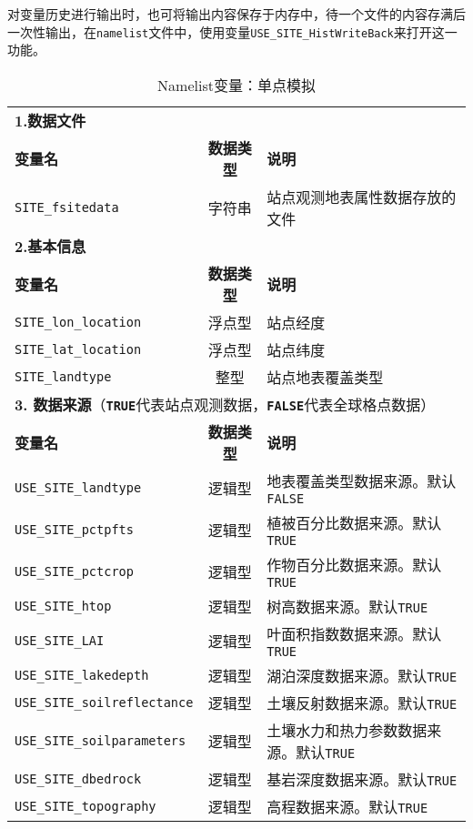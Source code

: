 对变量历史进行输出时，也可将输出内容保存于内存中，待一个文件的内容存满后一次性输出，在\texttt{namelist}文件中，使用变量\texttt{USE\_SITE\_HistWriteBack}来打开这一功能。

\begin{table}[!htbp] \small
\caption{Namelist变量：单点模拟}
\label{table_nl_singlepoint}
\centering \renewcommand{\arraystretch}{1.5}
\begin{tabular}{lcp{}}
\toprule
\textbf{1.数据文件} & & \\
\textbf{变量名} & \textbf{数据类型} & \textbf{说明} \\
\texttt{SITE\_fsitedata} & 字符串 & 站点观测地表属性数据存放的文件 \\\midrule
\textbf{2.基本信息} & & \\
\textbf{变量名} & \textbf{数据类型} & \textbf{说明} \\
\texttt{SITE\_lon\_location} & 浮点型 & 站点经度 \\
\texttt{SITE\_lat\_location} & 浮点型 & 站点纬度 \\
\texttt{SITE\_landtype} & 整型 & 站点地表覆盖类型 \\
\midrule
\multicolumn{3}{l}{\textbf{3. 数据来源}（\textbf{\texttt{TRUE}}代表站点观测数据，\textbf{\texttt{FALSE}}代表全球格点数据）} \\
\textbf{变量名} & \textbf{数据类型} & \textbf{说明} \\
\texttt{USE\_SITE\_landtype} & 逻辑型 & 地表覆盖类型数据来源。默认\texttt{FALSE} \\
\texttt{USE\_SITE\_pctpfts} & 逻辑型 & 植被百分比数据来源。默认\texttt{TRUE} \\
\texttt{USE\_SITE\_pctcrop} & 逻辑型 & 作物百分比数据来源。默认\texttt{TRUE} \\
\texttt{USE\_SITE\_htop} & 逻辑型 & 树高数据来源。默认\texttt{TRUE} \\
\texttt{USE\_SITE\_LAI} & 逻辑型 & 叶面积指数数据来源。默认\texttt{TRUE} \\
\texttt{USE\_SITE\_lakedepth} & 逻辑型 & 湖泊深度数据来源。默认\texttt{TRUE} \\
\texttt{USE\_SITE\_soilreflectance} & 逻辑型 & 土壤反射数据来源。默认\texttt{TRUE} \\
\texttt{USE\_SITE\_soilparameters} & 逻辑型 & 土壤水力和热力参数数据来源。默认\texttt{TRUE} \\
\texttt{USE\_SITE\_dbedrock} & 逻辑型 & 基岩深度数据来源。默认\texttt{TRUE} \\
\texttt{USE\_SITE\_topography} & 逻辑型 & 高程数据来源。默认\texttt{TRUE} \\

\end{tabular}
\end{table}
